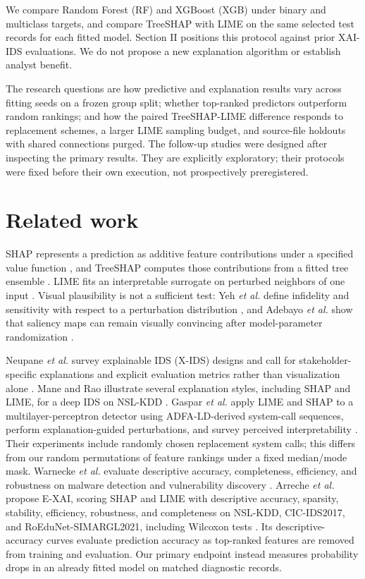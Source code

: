 \documentclass[conference,letterpaper]{IEEEtran}
\begin{document}
We compare Random Forest (RF) \cite{ref5} and XGBoost (XGB) \cite{ref6} under binary and multiclass targets, and compare TreeSHAP with LIME on the same selected test records for each fitted model. Section II positions this protocol against prior XAI-IDS evaluations. We do not propose a new explanation algorithm or establish analyst benefit.

The research questions are how predictive and explanation results vary across fitting seeds on a frozen group split; whether top-ranked predictors outperform random rankings; and how the paired TreeSHAP-LIME difference responds to replacement schemes, a larger LIME sampling budget, and source-file holdouts with shared connections purged. The follow-up studies were designed after inspecting the primary results. They are explicitly exploratory; their protocols were fixed before their own execution, not prospectively preregistered.

\section{Related work}
SHAP represents a prediction as additive feature contributions under a specified value function \cite{ref7}, and TreeSHAP computes those contributions from a fitted tree ensemble \cite{ref8}. LIME fits an interpretable surrogate on perturbed neighbors of one input \cite{ref9}. Visual plausibility is not a sufficient test: Yeh \emph{et al.} define infidelity and sensitivity with respect to a perturbation distribution \cite{ref10}, and Adebayo \emph{et al.} show that saliency maps can remain visually convincing after model-parameter randomization \cite{ref11}.

Neupane \emph{et al.} survey explainable IDS (X-IDS) designs and call for stakeholder-specific explanations and explicit evaluation metrics rather than visualization alone \cite{ref12}. Mane and Rao illustrate several explanation styles, including SHAP and LIME, for a deep IDS on NSL-KDD \cite{ref13}. Gaspar \emph{et al.} apply LIME and SHAP to a multilayer-perceptron detector using ADFA-LD-derived system-call sequences, perform explanation-guided perturbations, and survey perceived interpretability \cite{ref14}. Their experiments include randomly chosen replacement system calls; this differs from our random permutations of feature rankings under a fixed median/mode mask. Warnecke \emph{et al.} evaluate descriptive accuracy, completeness, efficiency, and robustness on malware detection and vulnerability discovery \cite{ref15}. Arreche \emph{et al.} propose E-XAI, scoring SHAP and LIME with descriptive accuracy, sparsity, stability, efficiency, robustness, and completeness on NSL-KDD, CIC-IDS2017, and RoEduNet-SIMARGL2021, including Wilcoxon tests \cite{ref16}. Its descriptive-accuracy curves evaluate prediction accuracy as top-ranked features are removed from training and evaluation. Our primary endpoint instead measures probability drops in an already fitted model on matched diagnostic records.
\end{document}
